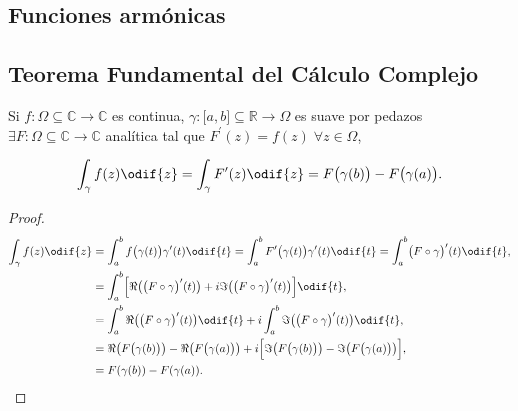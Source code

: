 \documentclass[../main.tex]{subfiles}
\begin{document}
\subsection{Funciones armónicas}

\subsection{Teorema Fundamental del Cálculo Complejo}

\begin{proposition}
    Si \(f \colon \Omega \subseteq \mathbb{C} \to \mathbb{C}\) es continua, \(\gamma
    \colon  \bigl[a, b\bigr] \subseteq \mathbb{R} \to \Omega\) es suave por pedazos
    \(\exists F \colon \Omega \subseteq \mathbb{C} \to \mathbb{C}\) analítica tal que
    \(F^{\prime}(z) = f(z)\; \forall z\in\Omega\),

    \begin{equation*}
        \int_{\gamma}^{}f(z)\odif{z} = \int_{\gamma}^{}F^{\prime}(z)\odif{z}
        = F \bigl(\gamma(b)\bigr) - F \bigl(\gamma(a)\bigr).
    \end{equation*}
\end{proposition}

\begin{proof}
    \begin{align*}
        \int_{\gamma}^{}f(z)\odif{z} & = \int_{a}^{b}f
        \bigl(\gamma(t)\bigr)\gamma^{\prime}(t)\odif{t} =
        \int_{a}^{b}F^{\prime}\bigl(\gamma(t)\bigr)\gamma^{\prime}(t)\odif{t} =
        \int_{a}^{b}\bigl(F \circ \gamma\bigr)^{\prime}(t)\odif{t},
        \\
        & = \int_{a}^{b}\Bigl[\Re \bigl(\bigl(F \circ \gamma\bigr)^{\prime}(t)
            \bigr) + i\Im \bigl(\bigl(F \circ \gamma\bigr)^{\prime}(t)
        \bigr)\Bigr]\odif{t},
        \\
        & = \int_{a}^{b}\Re \bigl(\bigl(F \circ \gamma\bigr)^{\prime}(t)
        \bigr)\odif{t} + i\int_{a}^{b}\Im \bigl(\bigl(F \circ \gamma\bigr)^{\prime}(t)
        \bigr)\odif{t},
        \\
        & = \Re \bigl(F \bigl(\gamma(b)\bigr)\bigr) - \Re \bigl(F
        \bigl(\gamma(a)\bigr)\bigr) + i \Bigl[\Im\bigl(F\bigl(\gamma(b)\bigr)\bigr) -
        \Im\bigl(F \bigl(\gamma(a)\bigr)\bigr)\Bigr],
        \\
        & = F(\gamma(b)) - F(\gamma(a)).
    \end{align*}
\end{proof}
\end{document}
